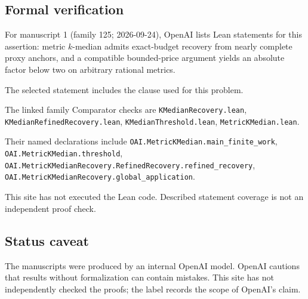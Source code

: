 \documentclass[11pt]{article}
\begin{document}
\subsection{Formal verification}
For manuscript 1 (family 125; 2026-09-24), OpenAI lists Lean statements for this assertion: metric $k$-median admits exact-budget recovery from nearly complete proxy anchors, and a compatible bounded-price argument yields an absolute factor below two on arbitrary rational metrics.

The selected statement includes the clause used for this problem.

The linked family Comparator checks are \texttt{KMedianRecovery.lean}, \texttt{KMedianRefinedRecovery.lean}, \texttt{KMedianThreshold.lean}, \texttt{MetricKMedian.lean}.

Their named declarations include \texttt{OAI.MetricKMedian.main\_finite\_work}, \texttt{OAI.MetricKMedian.threshold}, \texttt{OAI.MetricKMedianRecovery.RefinedRecovery.refined\_recovery}, \texttt{OAI.MetricKMedianRecovery.global\_application}.

This site has not executed the Lean code. Described statement coverage is not an independent proof check.

\subsection{Status caveat}
The manuscripts were produced by an internal OpenAI model. OpenAI cautions that results without formalization can contain mistakes. This site has not independently checked the proofs; the label records the scope of OpenAI's claim.
\end{document}
